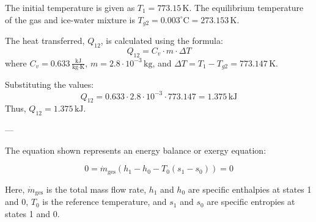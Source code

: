 The initial temperature is given as \( T_1 = 773.15 \, \text{K} \). The equilibrium temperature of the gas and ice-water mixture is \( T_{g2} = 0.003^\circ\text{C} = 273.153 \, \text{K} \).  

The heat transferred, \( Q_{12} \), is calculated using the formula:  
\[
Q_{12} = C_v \cdot m \cdot \Delta T
\]  
where \( C_v = 0.633 \, \frac{\text{kJ}}{\text{kg·K}} \), \( m = 2.8 \cdot 10^{-3} \, \text{kg} \), and \( \Delta T = T_1 - T_{g2} = 773.147 \, \text{K} \).  

Substituting the values:  
\[
Q_{12} = 0.633 \cdot 2.8 \cdot 10^{-3} \cdot 773.147 = 1.375 \, \text{kJ}
\]  
Thus, \( Q_{12} = 1.375 \, \text{kJ} \).

---

The equation shown represents an energy balance or exergy equation:  

\[
0 = \dot{m}_{\text{ges}} \left( h_1 - h_0 - T_0 (s_1 - s_0) \right) = 0
\]  

Here, \( \dot{m}_{\text{ges}} \) is the total mass flow rate, \( h_1 \) and \( h_0 \) are specific enthalpies at states 1 and 0, \( T_0 \) is the reference temperature, and \( s_1 \) and \( s_0 \) are specific entropies at states 1 and 0.